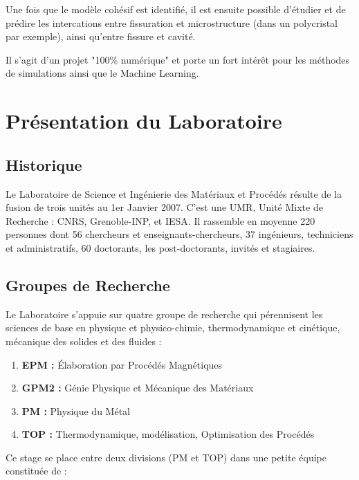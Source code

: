     Une fois que le modèle cohésif est identifié, il est ensuite possible d'étudier et de prédire les intercations entre fissuration et microstructure (dans un polycristal par exemple), ainsi qu'entre fissure et cavité. \medskip

    Il s'agit d'un projet "100\% numérique" et porte un fort intérêt pour les méthodes de simulations ainsi que le Machine Learning.

\section{Présentation du Laboratoire}

    \subsection{Historique}

        Le Laboratoire de Science et Ingénierie des Matériaux et Procédés résulte de la fusion de trois unités au 1er Janvier 2007. C'est une UMR, Unité Mixte de Recherche : CNRS, Grenoble-INP, et IESA. Il rassemble en moyenne 220 personnes dont 56 chercheurs et enseignants-chercheurs, 37 ingénieurs, techniciens et administratifs, 60 doctorants, les post-doctorants, invités et stagiaires. 

    \subsection{Groupes de Recherche}

        Le Laboratoire s'appuie sur quatre groupe de recherche qui pérennisent les sciences de base en physique et physico-chimie, thermodynamique et cinétique, mécanique des solides et des fluides : 

        \begin{enumerate}[\hspace{3em}$\bullet$]
            \item \textbf{EPM : }Élaboration par Procédés Magnétiques
            \item \textbf{GPM2 : }Génie Physique et Mécanique des Matériaux
            \item \textbf{PM : }Physique du Métal
            \item \textbf{TOP : }Thermodynamique, modélisation, Optimisation des Procédés
        \end{enumerate}
    
        Ce stage se place entre deux divisions (PM et TOP) dans une petite équipe constituée de : 

